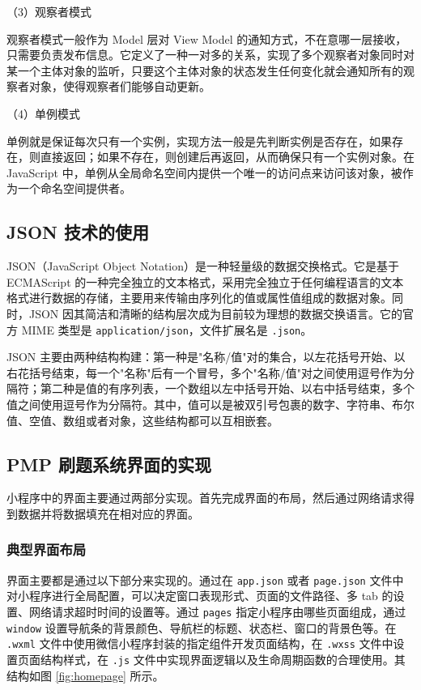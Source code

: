 （3）观察者模式

观察者模式一般作为 Model 层对 View Model 的通知方式，不在意哪一层接收，只需要负责发布信息。它定义了一种一对多的关系，实现了多个观察者对象同时对某一个主体对象的监听，只要这个主体对象的状态发生任何变化就会通知所有的观察者对象，使得观察者们能够自动更新。

（4）单例模式

单例就是保证每次只有一个实例，实现方法一般是先判断实例是否存在，如果存在，则直接返回；如果不存在，则创建后再返回，从而确保只有一个实例对象。在 JavaScript 中，单例从全局命名空间内提供一个唯一的访问点来访问该对象，被作为一个命名空间提供者。

\subsection{JSON 技术的使用}

JSON（JavaScript Object Notation）是一种轻量级的数据交换格式。它是基于 ECMAScript 的一种完全独立的文本格式，采用完全独立于任何编程语言的文本格式进行数据的存储，主要用来传输由序列化的值或属性值组成的数据对象。同时，JSON 因其简洁和清晰的结构层次成为目前较为理想的数据交换语言。它的官方 MIME 类型是 \texttt{application/json}，文件扩展名是 \texttt{.json}。

JSON 主要由两种结构构建：第一种是"名称/值"对的集合，以左花括号开始、以右花括号结束，每一个"名称"后有一个冒号，多个"名称/值"对之间使用逗号作为分隔符；第二种是值的有序列表，一个数组以左中括号开始、以右中括号结束，多个值之间使用逗号作为分隔符。其中，值可以是被双引号包裹的数字、字符串、布尔值、空值、数组或者对象，这些结构都可以互相嵌套。

\subsection{PMP 刷题系统界面的实现}

小程序中的界面主要通过两部分实现。首先完成界面的布局，然后通过网络请求得到数据并将数据填充在相对应的界面。

\subsubsection{典型界面布局}

界面主要都是通过以下部分来实现的。通过在 \texttt{app.json} 或者 \texttt{page.json} 文件中对小程序进行全局配置，可以决定窗口表现形式、页面的文件路径、多 tab 的设置、网络请求超时时间的设置等。通过 \texttt{pages} 指定小程序由哪些页面组成，通过 \texttt{window} 设置导航条的背景颜色、导航栏的标题、状态栏、窗口的背景色等。在 \texttt{.wxml} 文件中使用微信小程序封装的指定组件开发页面结构，在 \texttt{.wxss} 文件中设置页面结构样式，在 \texttt{.js} 文件中实现界面逻辑以及生命周期函数的合理使用。其结构如图 \ref{fig:homepage} 所示。

